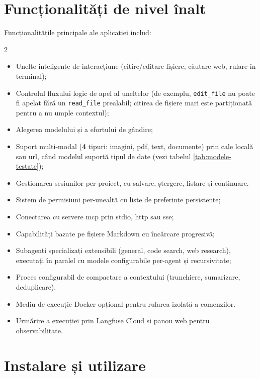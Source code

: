 \documentclass[12pt, a4paper, oneside, romanian]{teza-upb}
\begin{document}
  \section{Funcționalități de nivel înalt}

  Funcționalitățile principale ale aplicației includ:
  \begin{multicols}{2}
  \begin{itemize}\itemsep=0pt\parsep=0pt 
      \item Unelte inteligente de interacțiune (citire/editare fișiere, căutare web, rulare în terminal);
      \item Controlul fluxului logic de apel al uneltelor (de exemplu, \texttt{edit\_file} nu poate fi apelat fără un \texttt{read\_file} prealabil; citirea de fișiere mari este
  partiționată pentru a nu umple contextul);
      \item Alegerea modelului și a efortului de gândire;
      \item Suport multi-modal (\textbf{4} tipuri: imagini, \ac{pdf}, text, documente) prin cale locală sau \ac{url}, când modelul suportă tipul de date (vezi tabelul
  \ref{tab:modele-testate});
      \item Gestionarea sesiunilor per-proiect, cu salvare, ștergere, listare și continuare.
      \item Sistem de permisiuni per-unealtă cu liste de preferințe persistente;
      \item Conectarea cu servere \ac{mcp} prin \ac{stdio}, \ac{http} sau \ac{sse};
      \item Capabilități bazate pe fișiere Markdown cu încărcare progresivă;
      \item Subagenți specializați extensibili (general, code search, web research), executați în paralel cu modele configurabile per-agent și recursivitate;
      \item Proces configurabil de compactare a contextului (trunchiere, sumarizare, deduplicare).
      \item Mediu de execuție Docker opțional pentru rularea izolată a comenzilor.
      \item Urmărire a execuției prin Langfuse Cloud și panou web pentru observabilitate.
  \end{itemize}
  \end{multicols}

  \section{Instalare și utilizare}
 
\end{document}
